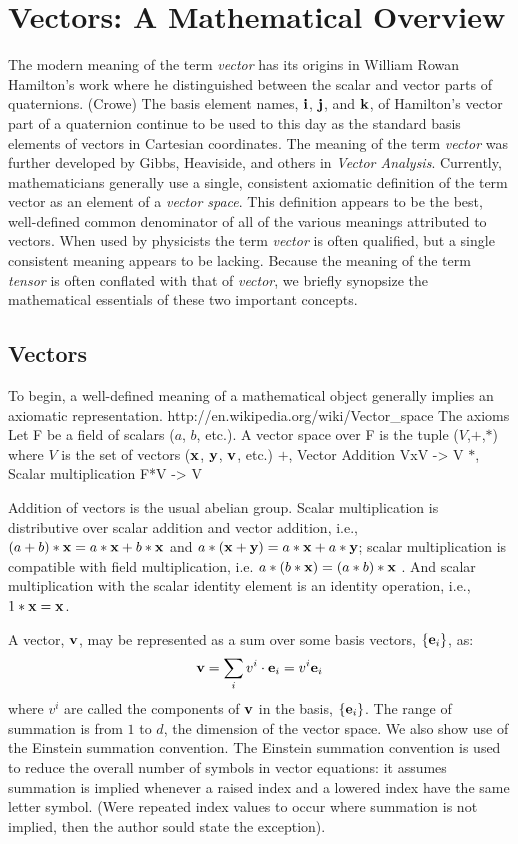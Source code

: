 \documentclass{llncs}
\begin{document}
\section{Vectors: A Mathematical Overview}

The modern meaning of the term {\em vector} has its origins in William
Rowan Hamilton's work where he distinguished between the scalar and
vector parts of quaternions. (Crowe)
The basis element names, ${\bf i}$, ${\bf j}$, and ${\bf k}$,
of Hamilton's vector part of a quaternion continue to be used to
this day as the standard basis elements of vectors in Cartesian
coordinates.
The meaning of the term {\em vector} was further developed by Gibbs,
Heaviside, and others in {\em Vector Analysis}.
Currently, mathematicians generally use a single, consistent axiomatic
definition of the term vector as an element of a {\em vector space}.
This definition appears to be the best, well-defined common
denominator of all of the various meanings attributed to vectors.
When used by physicists the term {\em vector} is often qualified, but
a single consistent meaning appears to be lacking.
Because the meaning of the term {\em tensor} is often conflated with
that of {\em vector}, we briefly synopsize the mathematical essentials
of these two important concepts.

\subsection{Vectors}

To begin, a well-defined meaning of a mathematical object generally
implies an axiomatic representation.
http://en.wikipedia.org/wiki/Vector\_space
The axioms
Let F be a field of scalars ($a$, $b$, etc.). A vector space over F is the tuple
($V$,$+$,$*$) where
$V$ is the set of vectors (${\bf x}$, ${\bf y}$, ${\bf v}$, etc.)
$+$, Vector Addition VxV -> V
$*$, Scalar multiplication F*V -> V

Addition of vectors is the usual abelian group.
Scalar multiplication is distributive over scalar addition and vector
addition, i.e.,
$(a+b)*{\bf x} = a*{\bf x}+b*{\bf x}$ and
$a*({\bf x} + {\bf y}) = a*{\bf x} + a*{\bf y}$;
scalar multiplication is compatible with field multiplication, i.e.
$a*(b*{\bf x}) = (a*b)*{\bf x}$ .
And scalar multiplication with the scalar identity element is an
identity operation, i.e., $1*{\bf x} = {\bf x}$.


A vector, ${\bf v}$, may be represented as a sum over some
basis vectors, $\{{\bf e}_i\}$, as:
\begin{equation}
{\bf v} = \sum_i v^i \cdot {\bf e}_i =  v^i {\bf e}_i
\end{equation}
where $v^i$ are called the components of ${\bf v}$ in the basis, $\{{\bf e}_i\}$.
The range of summation is from $1$ to $d$, the dimension of the vector
space.
We also show use of the Einstein summation convention.
The Einstein summation convention is used to reduce the overall number
of symbols in vector equations:
it assumes summation is implied whenever a raised index and a lowered
index have the same letter symbol.
(Were repeated index values to occur where summation is not implied,
then the author sould state the exception).
\end{document}

